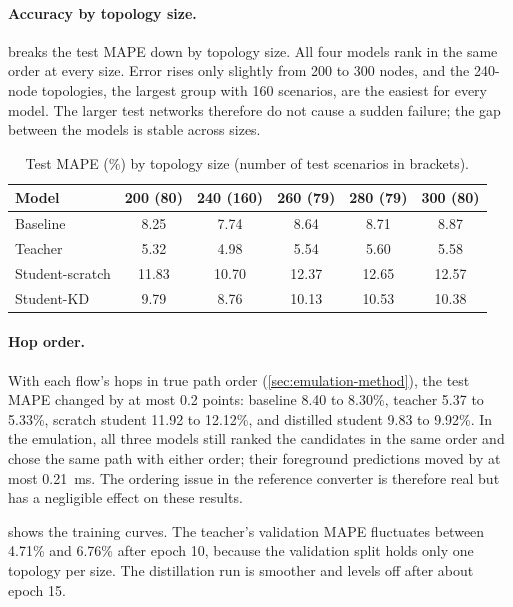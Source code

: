\paragraph{Accuracy by topology size.}  breaks the test MAPE down by topology size. All four models rank in the same order at every size. Error rises only slightly from 200 to 300 nodes, and the 240-node topologies, the largest group with 160 scenarios, are the easiest for every model. The larger test networks therefore do not cause a sudden failure; the gap between the models is stable across sizes.

\begin{table}[ht]
\centering
\small
\caption{Test MAPE (\%) by topology size (number of test scenarios in brackets).}
\label{tab:bysize}
\begin{tabular}{@{}l c c c c c@{}}
\toprule
\textbf{Model} & \textbf{200 (80)} & \textbf{240 (160)} & \textbf{260 (79)} & \textbf{280 (79)} & \textbf{300 (80)} \\
\midrule
Baseline        & 8.25  & 7.74  & 8.64  & 8.71  & 8.87  \\
Teacher         & 5.32  & 4.98  & 5.54  & 5.60  & 5.58  \\
Student-scratch & 11.83 & 10.70 & 12.37 & 12.65 & 12.57 \\
Student-KD      & 9.79  & 8.76  & 10.13 & 10.53 & 10.38 \\
\bottomrule
\end{tabular}
\end{table}

\paragraph{Hop order.} \label{sec:hoporder} With each flow's hops in true path order (\cref{sec:emulation-method}), the test MAPE changed by at most 0.2 points: baseline 8.40 to 8.30\%, teacher 5.37 to 5.33\%, scratch student 11.92 to 12.12\%, and distilled student 9.83 to 9.92\%. In the emulation, all three models still ranked the candidates in the same order and chose the same path with either order; their foreground predictions moved by at most 0.21~ms. The ordering issue in the reference converter is therefore real but has a negligible effect on these results.

 shows the training curves. The teacher's validation MAPE fluctuates between 4.71\% and 6.76\% after epoch 10, because the validation split holds only one topology per size. The distillation run is smoother and levels off after about epoch 15.


